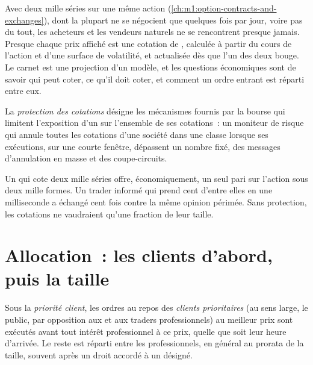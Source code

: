Avec deux mille séries sur une même action (\cref{ch:m1:option-contracts-and-exchanges}),
dont la plupart ne se négocient que quelques fois par jour, voire pas du tout, les acheteurs
et les vendeurs naturels ne se rencontrent presque jamais. Presque chaque prix affiché
est une cotation de , calculée à partir du cours de l'action et d'une
surface de volatilité, et actualisée dès que l'un des deux bouge. Le carnet est une
projection d'un modèle, et les questions économiques sont de savoir qui peut coter,
ce qu'il doit coter, et comment un ordre entrant est réparti entre eux.

\begin{definition}\label{def:m1:options-market-structure:protection}
La \emph{protection des cotations} désigne les
mécanismes fournis par la bourse qui limitent l'exposition d'un  sur
l'ensemble de ses cotations~: un moniteur de risque qui annule toutes les cotations d'une société
dans une classe lorsque ses exécutions, sur une courte fenêtre, dépassent un nombre fixé,
des messages d'annulation en masse et des coupe-circuits.
\end{definition}

Un  qui cote deux mille séries offre, économiquement, un seul pari
sur l'action sous deux mille formes. Un trader informé qui prend
cent d'entre elles en une milliseconde a échangé cent fois contre la même opinion périmée.
Sans protection, les cotations ne vaudraient qu'une fraction de leur taille.

\section{Allocation~: les clients d'abord, puis la taille}

\begin{definition}\label{def:m1:options-market-structure:customer}
Sous la \emph{priorité client}, les ordres au repos des
\emph{clients prioritaires} (au sens large, le public, par opposition aux 
et aux traders professionnels) au meilleur prix sont exécutés avant tout
intérêt professionnel à ce prix, quelle que soit leur heure d'arrivée. Le
reste est réparti entre les professionnels, en général au prorata de la taille,
souvent après un droit accordé à un  désigné.
\end{definition}

